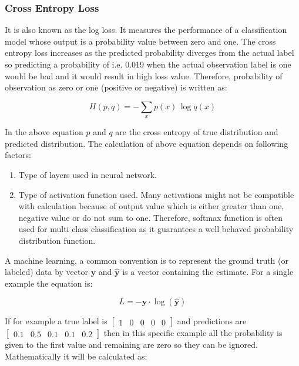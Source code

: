 \documentclass[11pt]{article}
\begin{document}
\subsubsection{Cross Entropy Loss}
It is also known as the log loss. It measures the performance of a classification model whose output is a probability value between zero and one. The cross entropy loss increases as the predicted probability diverges from the actual label so predicting a probability of i.e. 0.019 when the actual observation label is one would be bad and it would result in high loss value. Therefore, probability of observation as zero or one (positive or negative) is written as:

\begin{equation}
\label{crossent}
{\displaystyle H(p,q)=-\sum _{x}p(x)\,\log q(x)}
\end{equation}

In the above equation $p$ and $q$ are the cross entropy of true distribution and predicted distribution. The calculation of above equation depends on following factors:

\begin{enumerate}
	\item Type of layers used in neural network.
	\item Type of activation function used. Many activations might not be compatible with calculation because of output value which is either greater than one, negative value or do not sum to one. Therefore, softmax function is often used for multi class classification as it guarantees a well behaved probability distribution function.
\end{enumerate}

A machine learning, a common convention is to represent the ground truth (or labeled) data by vector $\mathbf{y}$ and $\mathbf{\hat{y}}$ is a vector containing the estimate. For a single example the equation is:

\begin{equation}
L = - \mathbf{y} \cdot \log(\mathbf{\hat{y}})
\end{equation}

If for example a true label is $\left[\begin{array}{llllll}{1} & {0} & {0} & {0} & {0}\end{array}\right]$ and predictions are $\left[\begin{array}{llllll}{0.1} & {0.5} & {0.1} & {0.1} & {0.2}\end{array}\right]$ then in this specific example all the probability is given to the first value and remaining are zero so they can be ignored. Mathematically it will be calculated as:
\end{document}
